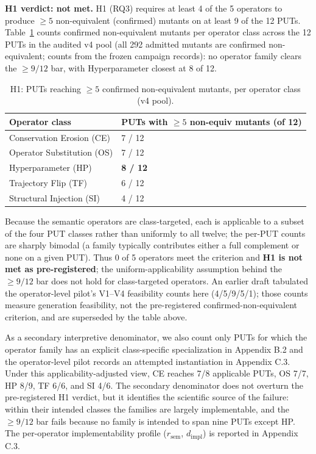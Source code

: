 \documentclass[review,12pt,authoryear]{elsarticle}
\newcounter{none}                   %
\begin{document}
\textbf{H1 verdict: not met.} H1 (RQ3) requires at least 4 of the 5
operators to produce $\geq 5$ non-equivalent (confirmed) mutants on at
least 9 of the 12 PUTs. Table~\ref{tab:p2-32} counts confirmed
non-equivalent mutants per operator class across the 12 PUTs in the
audited v4 pool (all 292 admitted mutants are confirmed non-equivalent;
counts from the frozen campaign records): no
operator family clears the $\geq 9/12$ bar, with Hyperparameter closest
at 8 of 12.

{\def\LTcaptype{table} %
\begin{longtable}[]{@{}ll@{}}
\caption{H1: PUTs reaching $\geq 5$ confirmed non-equivalent mutants,
per operator class (v4 pool).}\label{tab:p2-32}\\
\toprule\noalign{}
Operator class & PUTs with $\geq 5$ non-equiv mutants (of 12) \\
\midrule\noalign{}
\endfirsthead
\endhead
\bottomrule\noalign{}
\endlastfoot
Conservation Erosion (CE) & 7 / 12 \\
Operator Substitution (OS) & 7 / 12 \\
Hyperparameter (HP) & \textbf{8 / 12} \\
Trajectory Flip (TF) & 6 / 12 \\
Structural Injection (SI) & 4 / 12 \\
\end{longtable}
}

Because the semantic operators are class-targeted, each is applicable
to a subset of the four PUT classes rather than uniformly to all twelve;
the per-PUT counts are sharply bimodal (a family typically contributes
either a full complement or none on a given PUT). Thus 0 of 5 operators
meet the criterion and \textbf{H1 is
not met as pre-registered}; the uniform-applicability assumption behind
the $\geq 9/12$ bar does not hold for class-targeted operators. An
earlier draft tabulated the operator-level pilot's V1--V4 feasibility
counts here (4/5/9/5/1); those counts measure generation feasibility,
not the pre-registered confirmed-non-equivalent criterion, and are
superseded by the table above.

As a secondary interpretive denominator, we also count only PUTs for
which the operator family has an explicit class-specific specialization
in Appendix B.2 and the operator-level pilot records an attempted
instantiation in Appendix C.3. Under this applicability-adjusted view,
CE reaches 7/8 applicable PUTs, OS 7/7, HP 8/9, TF 6/6, and SI 4/6. The
secondary denominator does not overturn the pre-registered H1 verdict,
but it identifies the scientific source of the failure: within their
intended classes the families are largely implementable, and the
$\geq 9/12$ bar fails because no family is intended to span nine PUTs
except HP. The per-operator implementability profile ($r_{\mathrm{sem}}$,
$d_{\mathrm{impl}}$) is reported in Appendix C.3.
\end{document}
